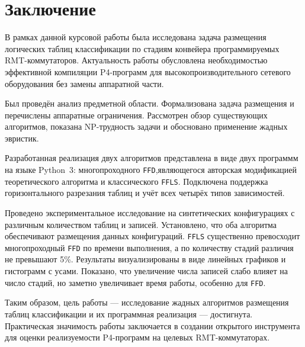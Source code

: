 \section{Заключение}
\label{sec:Chapter7} 

В рамках данной курсовой работы была исследована задача размещения логических таблиц классификации по стадиям конвейера программируемых RMT-коммутаторов. Актуальность работы обусловлена необходимостью эффективной компиляции P4-программ для высокопроизводительного сетевого оборудования без замены аппаратной части.

Был проведён анализ предметной области. Формализована задача размещения и перечислены аппаратные ограничения. Рассмотрен  обзор существующих алгоритмов, показана NP-трудность задачи и обосновано применение жадных эвристик. 

Разработанная реализация двух алгоритмов представлена в виде двух программм на языке Python~3: многопроходного \texttt{FFD},являющегося авторская модификацией теоретического алгоритма и классического \texttt{FFLS}. Подключена поддержка горизонтального разрезания таблиц и учёт всех четырёх типов зависимостей.

Проведено экспериментальное исследование на синтетических конфигурациях с различным количеством таблиц и записей. Установлено, что оба алгоритма обеспечивают размещения данных конфигураций. \texttt{FFLS} существенно превосходит многопроходный \texttt{FFD} по времени выполнения, а по количеству стадий различия не превышают 5\%.
Результаты визуализированы в виде линейных графиков и гистограмм с усами. Показано, что увеличение числа записей слабо влияет на число стадий, но заметно увеличивает время работы, особенно для \texttt{FFD}.

Таким образом, цель работы — исследование жадных алгоритмов размещения таблиц классификации и их программная реализация — достигнута. Практическая значимость работы заключается в создании открытого инструмента для оценки реализуемости P4-программ на целевых RMT-коммутаторах.
